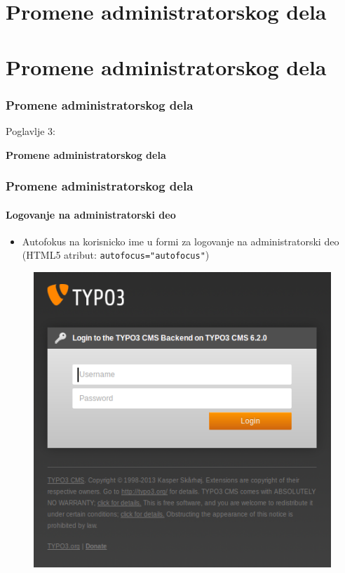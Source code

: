 %

\section{Promene administratorskog dela}
\section{Promene administratorskog dela}
\begin{frame}[fragile]
	\frametitle{Promene administratorskog dela}

	\begin{center}\huge{Poglavlje 3:}\end{center}
	\begin{center}\huge{\color{typo3darkgrey}\textbf{Promene administratorskog dela}}\end{center}

\end{frame}


\begin{frame}[fragile]
	\frametitle{Promene administratorskog dela}
	\framesubtitle{Logovanje na administratorski deo}

 	\begin{itemize}
		\item Autofokus na korisnicko ime u formi za logovanje na administratorski deo\newline
			(HTML5 atribut: \texttt{autofocus="autofocus"})
	\end{itemize}

	\begin{figure}
		\includegraphics[width=0.4\linewidth]{Images/BackendChanges/BackendLogin.png}
	\end{figure}

\end{frame}

